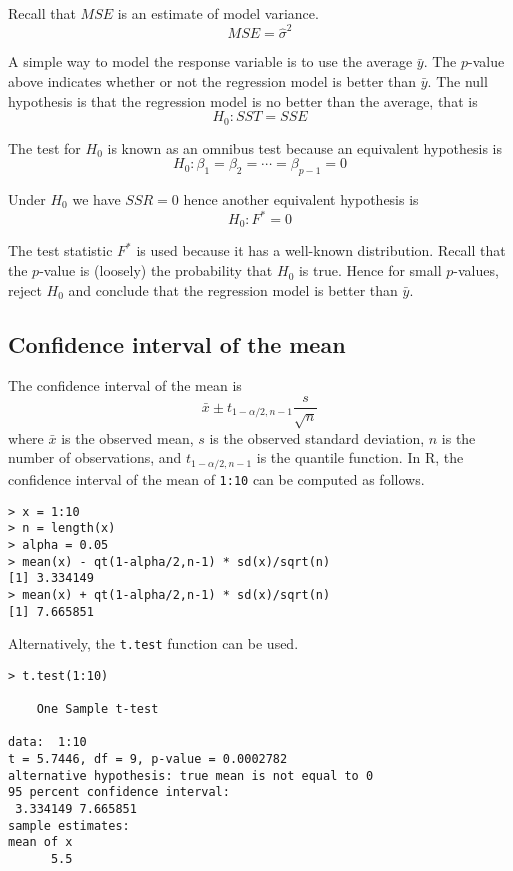 \documentclass[12pt]{article}
\begin{document}
Recall that $MSE$ is an estimate of model variance.
\[
MSE=\hat\sigma^2
\]

A simple way to model the response variable is to use the average $\bar y$.
The $p$-value above indicates whether or not the regression model
is better than $\bar y$.
The null hypothesis is that the regression model is no better
than the average, that is
\[
H_0:SST=SSE
\]

The test for $H_0$ is known as an omnibus test because an
equivalent hypothesis is
\[
H_0:\beta_1=\beta_2=\cdots=\beta_{p-1}=0
\]

Under $H_0$ we have $SSR=0$ hence another
equivalent hypothesis is
\[
H_0:F^*=0
\]

The test statistic $F^*$ is used
because it has a well-known distribution.
Recall that the $p$-value is (loosely) the probability
that $H_0$ is true.
Hence for small $p$-values, reject $H_0$ and
conclude that the regression model is better than $\bar y$.

\subsection*{Confidence interval of the mean}
The confidence interval of the mean is
\[
\bar x\pm t_{1-\alpha/2, n-1}\frac{s}{\sqrt n}
\]
where $\bar x$ is the observed mean,
$s$ is the observed standard deviation,
$n$ is the number of observations,
and $t_{1-\alpha/2, n-1}$ is the quantile function.
In R, the confidence interval of the mean of \verb$1:10$
can be computed as follows.

{\scriptsize\begin{verbatim}
> x = 1:10
> n = length(x)
> alpha = 0.05
> mean(x) - qt(1-alpha/2,n-1) * sd(x)/sqrt(n)
[1] 3.334149
> mean(x) + qt(1-alpha/2,n-1) * sd(x)/sqrt(n)
[1] 7.665851
\end{verbatim}}

Alternatively, the \verb$t.test$ function can be used.

{\scriptsize\begin{verbatim}
> t.test(1:10)

	One Sample t-test

data:  1:10
t = 5.7446, df = 9, p-value = 0.0002782
alternative hypothesis: true mean is not equal to 0
95 percent confidence interval:
 3.334149 7.665851
sample estimates:
mean of x 
      5.5 
\end{verbatim}}
\end{document}
